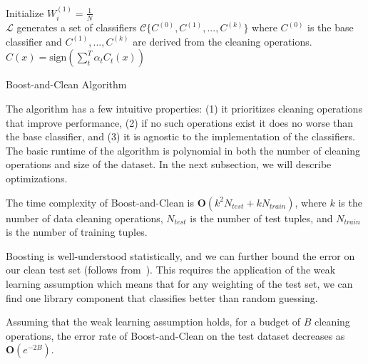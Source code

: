 \begin{algorithm}
Initialize $W^{(1)}_i = \frac{1}{N}$\\

$\mathcal{L}$ generates a set of classifiers $\mathcal{C} \{C^{(0)}, C^{(1)},...,C^{(k)}\}$ where $C^{(0)}$ is the base classifier and $C^{(1)},...,C^{(k)}$ are derived from the cleaning operations.\\

\Return $C(x) = \text{sign}(\sum_t^T \alpha_t C_t(x) )$
\caption{Boost-and-Clean Algorithm}
\label{alg:rsa}
\end{algorithm}

The algorithm has a few intuitive properties: (1) it prioritizes cleaning operations that improve performance, (2) if no such operations exist it does no worse than the base classifier, and (3) it is agnostic to the implementation of the classifiers.
The basic runtime of the algorithm is polynomial in both the number of cleaning operations and size of the dataset. In the next subsection, we will describe optimizations.

\begin{proposition}
The time complexity of Boost-and-Clean is $\mathbf{O}(k^2 N_{test} + k N_{train})$, where $k$ is the number of data cleaning operations, $N_{test}$ is the number of test tuples, and $N_{train}$ is the number of training tuples.
\end{proposition}

Boosting is well-understood statistically, and we can further bound the error on our clean test set (follows from~\cite{schapire2003boosting}). This requires the application of the weak learning assumption which means that for any weighting of the test set, we can find one library component that classifies better than random guessing. 

\begin{proposition}
Assuming that the weak learning assumption holds, for a budget of $B$ cleaning operations, the error rate of Boost-and-Clean on the test dataset decreases as $\mathbf{O}(e^{-2B})$.
\end{proposition}




